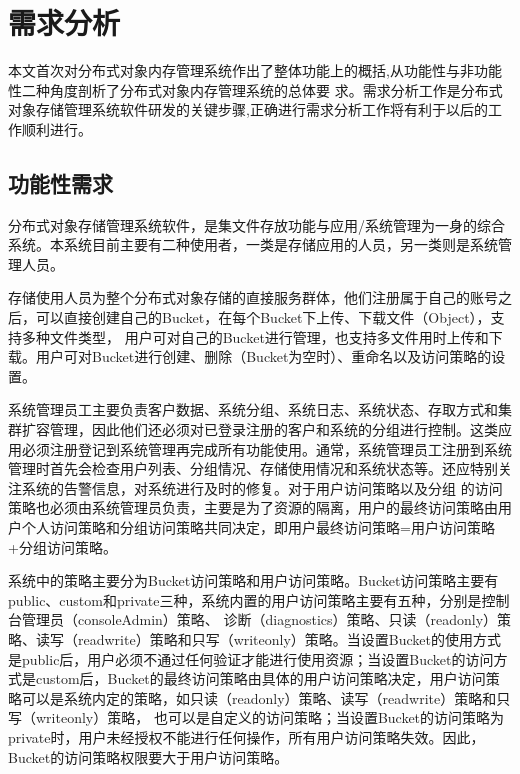 \chapter{需求分析}

本文首次对分布式对象内存管理系统作出了整体功能上的概括,从功能性与非功能性二种角度剖析了分布式对象内存管理系统的总体要
求。需求分析工作是分布式对象存储管理系统软件研发的关键步骤,正确进行需求分析工作将有利于以后的工作顺利进行。

\section{功能性需求}
分布式对象存储管理系统软件，是集文件存放功能与应用/系统管理为一身的综合系统。本系统目前主要有二种使用者，一类是存储应用的人员，另一类则是系统管理人员。

存储使用人员为整个分布式对象存储的直接服务群体，他们注册属于自己的账号之后，可以直接创建自己的Bucket，在每个Bucket下上传、下载文件（Object），支持多种文件类型，
用户可对自己的Bucket进行管理，也支持多文件用时上传和下载。用户可对Bucket进行创建、删除（Bucket为空时）、重命名以及访问策略的设置。

系统管理员工主要负责客户数据、系统分组、系统日志、系统状态、存取方式和集群扩容管理，因此他们还必须对已登录注册的客户和系统的分组进行控制。这类应用必须注册登记到系统管理再完成所有功能使用。通常，系统管理员工注册到系统管理时首先会检查用户列表、分组情况、存储使用情况和系统状态等。还应特别关注系统的告警信息，对系统进行及时的修复。对于用户访问策略以及分组
的访问策略也必须由系统管理员负责，主要是为了资源的隔离，用户的最终访问策略由用户个人访问策略和分组访问策略共同决定，即用户最终访问策略=用户访问策略+分组访问策略。

系统中的策略主要分为Bucket访问策略和用户访问策略。Bucket访问策略主要有public、custom和private三种，系统内置的用户访问策略主要有五种，分别是控制台管理员（consoleAdmin）策略、
诊断（diagnostics）策略、只读（readonly）策略、读写（readwrite）策略和只写（writeonly）策略。当设置Bucket的使用方式是public后，用户必须不通过任何验证才能进行使用资源；当设置Bucket的访问方式是custom后，Bucket的最终访问策略由具体的用户访问策略决定，用户访问策略可以是系统内定的策略，如只读（readonly）策略、读写（readwrite）策略和只写（writeonly）策略，
也可以是自定义的访问策略；当设置Bucket的访问策略为private时，用户未经授权不能进行任何操作，所有用户访问策略失效。因此，Bucket的访问策略权限要大于用户访问策略。

